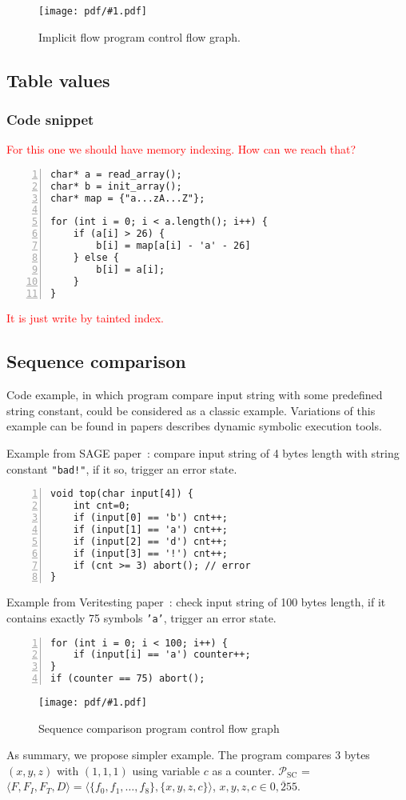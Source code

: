 \documentclass[oneside,a4paper]{article}  %
\newcommand{\sublevel}{\subsection}
\newcommand{\subsublevel}{\subsubsection}
\newcommand{\note}[1]{\textcolor{red}{#1}}
\newcommand{\centerimage}[2]{
\begin{figure}[h!]
    \begin{center}
        \texttt{[image: pdf/\#1.pdf]}
        \caption{#2}
    \end{center}
    \label{img:#1}
\end{figure}
}
\begin{document}
\centerimage{implicit}
    {Implicit flow program control flow graph.}

\sublevel{Table values}

\subsublevel*{Code snippet}

\note{For this one we should have memory indexing.
How can we reach that?}

\begin{lstlisting}[numbers=left,numberstyle=\scriptsize]
char* a = read_array();
char* b = init_array();
char* map = {"a...zA...Z"};

for (int i = 0; i < a.length(); i++) {
    if (a[i] > 26) {
        b[i] = map[a[i] - 'a' - 26]
    } else {
        b[i] = a[i];
    }
}
\end{lstlisting}

\note{It is just write by tainted index.}

\sublevel{Sequence comparison}

Code example, in which program compare input string with some
predefined string constant, could be considered as a classic example.
Variations of this example can be found in papers describes
dynamic symbolic execution tools.

Example from SAGE paper~\cite{sage}: compare input string of 4 bytes length
with string constant \texttt{"bad!"}, if it so, trigger an error state.
\begin{lstlisting}[numbers=left,numberstyle=\scriptsize]
void top(char input[4]) {
    int cnt=0;
    if (input[0] == 'b') cnt++;
    if (input[1] == 'a') cnt++;
    if (input[2] == 'd') cnt++;
    if (input[3] == '!') cnt++;
    if (cnt >= 3) abort(); // error
}
\end{lstlisting}

Example from Veritesting paper~\cite{veritesting}: check input string of
100 bytes length, if it contains exactly 75 symbols \texttt{'a'},
trigger an error state.
\begin{lstlisting}[numbers=left,numberstyle=\scriptsize]
for (int i = 0; i < 100; i++) {
    if (input[i] == 'a') counter++;
}
if (counter == 75) abort();
\end{lstlisting}

\centerimage{classic_cfg}
    {Sequence comparison program control flow graph}

As summary, we propose simpler example.
The program compares 3 bytes $(x, y, z)$ with $(1, 1, 1)$ using
variable $c$ as a counter.
$\mathcal{P}_{\text{SC}}$ = $\langle F, F_I, F_T, D \rangle =
    \langle \{f_0, f_1, \dots, f_8\},
    \{x, y, z, c\} \rangle$,
$x, y, z, c \in \overline{0, 255}$.
\end{document}
